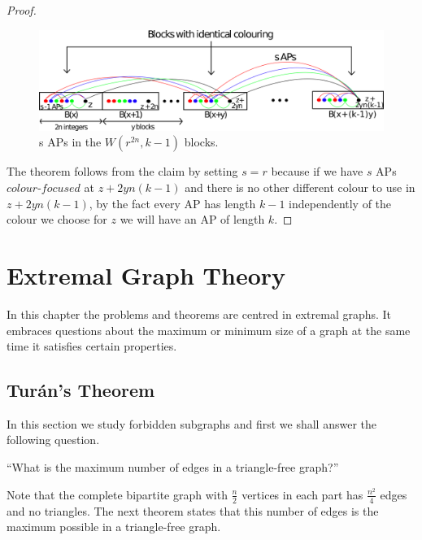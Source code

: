 \documentclass[12pt,twoside,a4paper,bibliography=totocnumbered]{book}
\numberwithin{equation}{section}
\theoremstyle{remark}
\begin{document}
\begin{proof}
\begin{figure}[H]
     \centering
     \includegraphics[scale=0.38]{Figuras/Van-der-Waerden-Blocks.png}
     \caption{s APs in the $W(r^{2n},k-1)$ blocks.}
     \label{fig:VanderWaerdenBlocks}
\end{figure}

The theorem follows from the claim by setting $s=r$ because if we have $s$  APs $\textit{colour-focused}$ at $z+2yn(k-1)$ and there is no other different colour to use in $z+2yn(k-1)$, by the fact every AP has length $k-1$  independently of the colour we choose for $z$ we will have an AP of length $k$.
\end{proof}



\chapter{Extremal Graph Theory}
In this chapter the problems and theorems are centred in extremal graphs. It embraces questions about the maximum or minimum size of a graph at the same time it satisfies certain properties.

\section{Turán's Theorem}
In this section we study forbidden subgraphs and first we shall answer the following question. 
\begin{center}``What is the maximum number of edges in a triangle-free graph?''\end{center}

Note that the complete bipartite graph with $\frac{n}{2}$ vertices in each part has $\frac{n^{2}}{4}$ edges and no triangles. The next theorem states that this number of edges is the maximum possible in a triangle-free graph.\\
\end{document}
